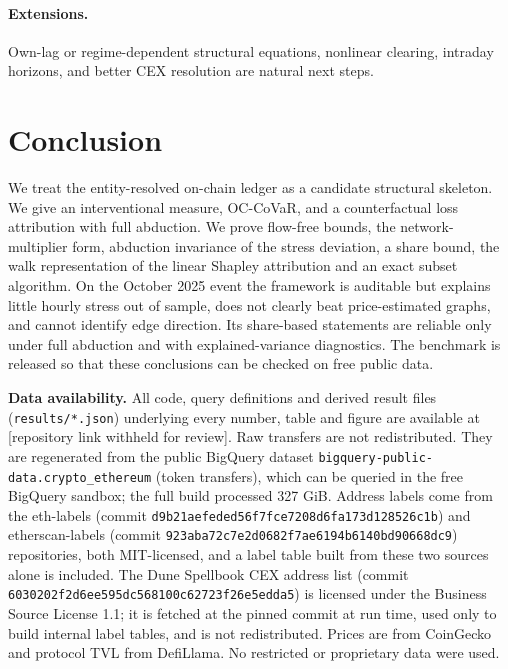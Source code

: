 \documentclass[referee,pdflatex,sn-mathphys-ay]{sn-jnl}
\theoremstyle{thmstyleone}%
\theoremstyle{thmstyletwo}%
\theoremstyle{thmstylethree}%
\begin{document}
\paragraph{Extensions.} Own-lag or regime-dependent structural equations, nonlinear clearing, intraday horizons, and better CEX resolution
are natural next steps.

\section{Conclusion}
\label{sec:conclusion}
We treat the entity-resolved on-chain ledger as a candidate structural skeleton. We give an interventional measure, OC-CoVaR, and a
counterfactual loss attribution with full abduction. We prove flow-free bounds, the network-multiplier form, abduction invariance of
the stress deviation, a share bound, the walk representation of the linear Shapley attribution and an exact subset algorithm. On the
October 2025 event the framework is auditable but explains little hourly stress out of sample, does not clearly beat price-estimated
graphs, and cannot identify edge direction. Its share-based statements are reliable only under full abduction and with
explained-variance diagnostics. The benchmark is released so that these conclusions can be checked on free public data.

\backmatter


\noindent\textbf{Data availability.} All code, query definitions and derived result files (\texttt{results/*.json}) underlying
every number, table and figure are available at [repository link withheld for review].
Raw transfers are not redistributed. They are regenerated from the public BigQuery dataset \texttt{bigquery-public-data.crypto\_ethereum}
(token transfers), which can be queried in the free BigQuery sandbox; the full build processed 327 GiB. Address labels come
from the eth-labels (commit \texttt{d9b21aefeded56f7fce7208d6fa173d128526c1b}) and etherscan-labels (commit \texttt{923aba72c7e2d0682f7ae6194b6140bd90668dc9}) repositories, both
MIT-licensed, and a label table built from these two sources alone is included. The Dune Spellbook CEX address list (commit
\texttt{6030202f2d6ee595dc568100c62723f26e5edda5}) is licensed under the Business Source License 1.1; it is fetched at the pinned commit at run time, used
only to build internal label tables, and is not redistributed. Prices are from CoinGecko and protocol TVL from DefiLlama. No
restricted or proprietary data were used.
\end{document}
